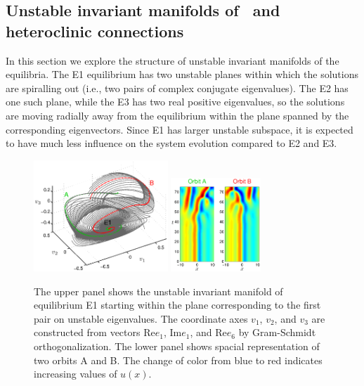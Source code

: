 \subsection{Unstable invariant manifolds of \eqva\ and heteroclinic
connections}

In this section we explore the structure of unstable invariant
manifolds of the equilibria.  The E1 equilibrium has two unstable
planes within which the solutions are spiralling out (i.e., two
pairs of complex conjugate eigenvalues).  The E2 has one such plane,
while the E3 has two real positive eigenvalues, so the solutions are
moving radially away from the equilibrium within the plane spanned
by the corresponding eigenvectors.  Since E1 has larger unstable
subspace, it is expected to have much less influence on the system
evolution compared to E2 and E3.

\begin{figure}[h]\vspace*{-5pt} \centering
\includegraphics[width=0.45\textwidth]{figs/ks22_E1_plane1_manifold.eps}
\includegraphics[width=0.3\textwidth]{figs/ks22_E1_plane1_orbits.eps}
\vspace*{-5pt}\caption{ {\small The upper panel shows the unstable
invariant manifold of equilibrium E1 starting within the plane
corresponding to the first pair on unstable eigenvalues. The
coordinate axes $v_1$, $v_2$, and $v_3$ are constructed from vectors
$\mathrm{Re} e_1$, $\mathrm{Im} e_1$, and $\mathrm{Re} e_6$
by Gram-Schmidt orthogonalization.
The lower panel shows spacial representation of two orbits A and B.
The change of color from blue to red indicates increasing values of
$u(x)$.}} \label{f:KS22E1man1}\vspace*{-5pt}
\end{figure}

